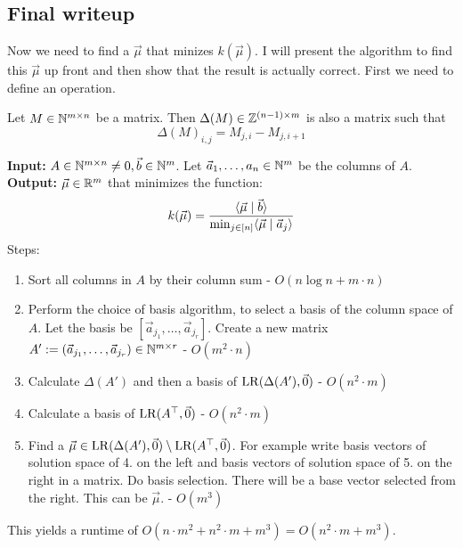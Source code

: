 \subsection{Final writeup}
Now we need to find a $\vec\mu$ that minizes $k(\vec\mu)$. I will present the algorithm to find this $\vec\mu$ up front and then show that the result is actually correct. First we need to define an operation. 
\begin{definition}
    Let $M \in \mathbb{N}^{m\times n}$ be a matrix. Then $\Delta(M) \in \mathbb{Z}^{(n-1)\times m}$ is also a matrix such that 
    $$\Delta(M)_{i,j} = M_{j,i} - M_{j,i+1}$$
\end{definition}

\begin{algorithm}
    \label{_algo}
    \textbf{Input: } $A\in\mathbb{N}^{m\times n} \neq 0, \vec b \in \mathbb{N}^m$. Let $\vec a_1, \dots, a_n\in\mathbb{N}^m$ be the columns of $A$.\\
    \textbf{Output: } $\vec\mu\in\mathbb{R}^m$ that minimizes the function:
    $$k(\vec\mu) = \frac{\langle \vec\mu \mid \vec b \rangle}{\min_{j\in[n]}\langle \vec\mu \mid \vec a_j \rangle}$$
    Steps:
    \begin{enumerate}
        \item Sort all columns in $A$ by their column sum - $O(n \log n + m \cdot n)$
        \item Perform the choice of basis algorithm, to select a basis of the column space of $A$. Let the basis be $[\vec a_{j_1}, \dots, \vec a_{j_r}]$. Create a new matrix $A' := (\vec a_{j_1}, \dots, \vec a_{j_r}) \in \mathbb{N}^{m \times r}$ - $O(m^2 \cdot n)$
        \item Calculate $\Delta(A')$ and then a basis of $\operatorname{LR}(\Delta(A'), \vec0)$ - $O(n^2 \cdot m)$
        \item Calculate a basis of $\operatorname{LR}(A^\top, \vec0)$ - $O(n^2 \cdot m)$
        \item Find a $\vec\mu \in \operatorname{LR}(\Delta(A'), \vec0) \setminus \operatorname{LR}(A^\top, \vec0)$. For example write basis vectors of solution space of 4. on the left and basis vectors of solution space of 5. on the right in a matrix. Do basis selection. There will be a base vector selected from the right. This can be $\vec\mu$. - $O(m^3)$
    \end{enumerate}
    This yields a runtime of $O(n \cdot m^2 + n^2 \cdot m + m^3) = O(n^2 \cdot m + m^3)$.
\end{algorithm}

